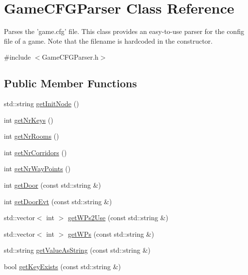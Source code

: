 \hypertarget{classGameCFGParser}{\section{\-Game\-C\-F\-G\-Parser \-Class \-Reference}
\label{classGameCFGParser}
}


\-Parses the 'game.\-cfg' file. \-This class provides an easy-\/to-\/use parser for the config file of a game. \-Note that the filename is hardcoded in the constructor.  




{\ttfamily \#include $<$\-Game\-C\-F\-G\-Parser.\-h$>$}

\subsection*{\-Public \-Member \-Functions}
\begin{DoxyCompactItemize}
\item 
std\-::string \hyperlink{classGameCFGParser_ad703ab9f55a3542232f90f6b87cd85e5}{get\-Init\-Node} ()
\item 
int \hyperlink{classGameCFGParser_a48546c5931ccc40303713cdbbc3362f7}{get\-Nr\-Keys} ()
\item 
int \hyperlink{classGameCFGParser_ac7001b9a73ab8d89870d4a01d3fcb3e9}{get\-Nr\-Rooms} ()
\item 
int \hyperlink{classGameCFGParser_af35e4757b4cb39753b3a3779252ef61f}{get\-Nr\-Corridors} ()
\item 
int \hyperlink{classGameCFGParser_a4762e0fc122db2360a01d92ccf66a290}{get\-Nr\-Way\-Points} ()
\item 
int \hyperlink{classGameCFGParser_af4e55769fb6c312e1946320f5871d137}{get\-Door} (const std\-::string \&)
\item 
int \hyperlink{classGameCFGParser_a331c9e8f80f4e9db2712062e8526ea0d}{get\-Door\-Evt} (const std\-::string \&)
\item 
std\-::vector$<$ int $>$ \hyperlink{classGameCFGParser_a6ebc74939d28da7cfd68018202aba3f4}{get\-W\-Ps2\-Use} (const std\-::string \&)
\item 
std\-::vector$<$ int $>$ \hyperlink{classGameCFGParser_a88232d196c405ce5736749db1f200981}{get\-W\-Ps} (const std\-::string \&)
\item 
std\-::string \hyperlink{classGameCFGParser_adb5f04b377373467e3568c546e1b0eb2}{get\-Value\-As\-String} (const std\-::string \&)
\item 
bool \hyperlink{classGameCFGParser_ab283cea504bf1db9d35a89e95b285402}{get\-Key\-Exists} (const std\-::string \&)
\end{DoxyCompactItemize}
